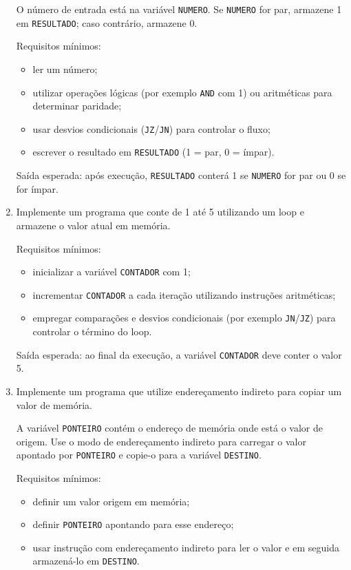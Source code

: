 \documentclass[12pt,a4paper]{article}
\begin{document}
\begin{enumerate}[left=0pt,label=\textbf{Exercício \arabic*:},itemsep=8pt]
O número de entrada está na variável \texttt{NUMERO}. Se \texttt{NUMERO} for par, armazene 1 em \texttt{RESULTADO}; caso contrário, armazene 0.

Requisitos mínimos:
\begin{itemize}
	\item ler um número;
	\item utilizar operações lógicas (por exemplo \texttt{AND} com 1) ou aritméticas para determinar paridade;
	\item usar desvios condicionais (\texttt{JZ}/\texttt{JN}) para controlar o fluxo;
	\item escrever o resultado em \texttt{RESULTADO} (1 = par, 0 = ímpar).
\end{itemize}

Saída esperada: após execução, \texttt{RESULTADO} conterá 1 se \texttt{NUMERO} for par ou 0 se for ímpar.

\item Implemente um programa que conte de 1 até 5 utilizando um loop e armazene o valor atual em memória.

Requisitos mínimos:
\begin{itemize}
	\item inicializar a variável \texttt{CONTADOR} com 1;
	\item incrementar \texttt{CONTADOR} a cada iteração utilizando instruções aritméticas;
	\item empregar comparações e desvios condicionais (por exemplo \texttt{JN}/\texttt{JZ}) para controlar o término do loop.
\end{itemize}

Saída esperada: ao final da execução, a variável \texttt{CONTADOR} deve conter o valor 5.

\item Implemente um programa que utilize endereçamento indireto para copiar um valor de memória.

A variável \texttt{PONTEIRO} contém o endereço de memória onde está o valor de origem. Use o modo de endereçamento indireto para carregar o valor apontado por \texttt{PONTEIRO} e copie-o para a variável \texttt{DESTINO}.

Requisitos mínimos:
\begin{itemize}
	\item definir um valor origem em memória;
	\item definir \texttt{PONTEIRO} apontando para esse endereço;
	\item usar instrução com endereçamento indireto para ler o valor e em seguida armazená-lo em \texttt{DESTINO}.
\end{itemize}


\end{enumerate}
\end{document}
